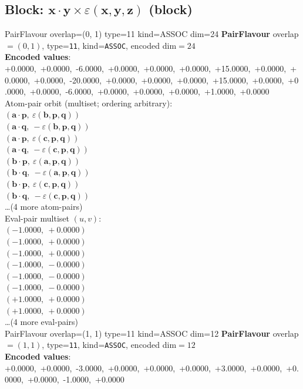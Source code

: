 \documentclass[a4paper,11pt]{article}
\newcommand{\pdcegfomjfhook}[2]{\mathbf{#1} \cdot \mathbf{#2}}
\newcommand{\kblbmcpggoncpf}[3]{\varepsilon(\mathbf{#1},\mathbf{#2},\mathbf{#3})}
\begin{document}
\subsection{Block: $\pdcegfomjfhook{x}{y} \times \kblbmcpggoncpf{x}{y}{z}$  (block)}
    PairFlavour  overlap=(0, 1)  type=11  kind=ASSOC  dim=24
\textbf{PairFlavour} overlap$=(0, 1)$, type=\texttt{11}, kind=\texttt{ASSOC}, encoded dim$=24$\\
\textbf{      Encoded values}: +0.0000,\ +0.0000,\ -6.0000,\ +0.0000,\ +0.0000,\ +0.0000,\ +15.0000,\ +0.0000,\ +0.0000,\ +0.0000,\ -20.0000,\ +0.0000,\ +0.0000,\ +0.0000,\ +15.0000,\ +0.0000,\ +0.0000,\ +0.0000,\ -6.0000,\ +0.0000,\ +0.0000,\ +0.0000,\ +1.0000,\ +0.0000\\
\quad Atom-pair orbit (multiset; ordering arbitrary):\\
$(\pdcegfomjfhook{a}{p},\ \kblbmcpggoncpf{b}{p}{q})$\\
$(\pdcegfomjfhook{a}{q},\ -\kblbmcpggoncpf{b}{p}{q})$\\
$(\pdcegfomjfhook{a}{p},\ \kblbmcpggoncpf{c}{p}{q})$\\
$(\pdcegfomjfhook{a}{q},\ -\kblbmcpggoncpf{c}{p}{q})$\\
$(\pdcegfomjfhook{b}{p},\ \kblbmcpggoncpf{a}{p}{q})$\\
$(\pdcegfomjfhook{b}{q},\ -\kblbmcpggoncpf{a}{p}{q})$\\
$(\pdcegfomjfhook{b}{p},\ \kblbmcpggoncpf{c}{p}{q})$\\
$(\pdcegfomjfhook{b}{q},\ -\kblbmcpggoncpf{c}{p}{q})$\\
\quad \ldots (4 more atom-pairs)\\
\quad Eval-pair multiset $(u, v)$:\\
$(-1.0000,\ +0.0000)$\\
$(-1.0000,\ +0.0000)$\\
$(-1.0000,\ +0.0000)$\\
$(-1.0000,\ -0.0000)$\\
$(-1.0000,\ -0.0000)$\\
$(-1.0000,\ -0.0000)$\\
$(+1.0000,\ +0.0000)$\\
$(+1.0000,\ +0.0000)$\\
\quad \ldots (4 more eval-pairs)\\
    PairFlavour  overlap=(1, 1)  type=11  kind=ASSOC  dim=12
\textbf{PairFlavour} overlap$=(1, 1)$, type=\texttt{11}, kind=\texttt{ASSOC}, encoded dim$=12$\\
\textbf{      Encoded values}: +0.0000,\ +0.0000,\ -3.0000,\ +0.0000,\ +0.0000,\ +0.0000,\ +3.0000,\ +0.0000,\ +0.0000,\ +0.0000,\ -1.0000,\ +0.0000\\
\end{document}
